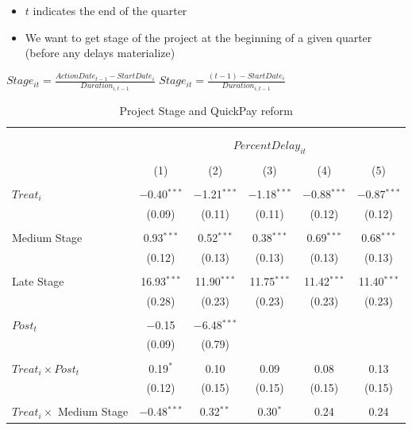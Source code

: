 \documentclass[
]{article}
\providecommand{\tightlist}{%
  \setlength{\itemsep}{0pt}\setlength{\parskip}{0pt}}
\begin{document}
\begin{itemize}
\tightlist
\item
  \(t\) indicates the end of the quarter
\item
  We want to get stage of the project at the beginning of a given
  quarter (before any delays materialize)
\end{itemize}

\(Stage_{it}=\frac{ActionDate_{t-1}-StartDate_i}{Duration_{i,t-1}}\)
\(Stage_{it}=\frac{(t-1)-StartDate_i}{Duration_{i,t-1}}\)

\begin{table}[H] \centering 
  \caption{Project Stage and QuickPay reform} 
  \label{} 
\small 
\begin{tabular}{@{\extracolsep{-2pt}}lccccc} 
\\[-1.8ex]\hline 
\hline \\[-1.8ex] 
\\[-1.8ex] & \multicolumn{5}{c}{$PercentDelay_{it}$  } \\ 
\\[-1.8ex] & (1) & (2) & (3) & (4) & (5)\\ 
\hline \\[-1.8ex] 
 $Treat_i$ & $-$0.40$^{***}$ & $-$1.21$^{***}$ & $-$1.18$^{***}$ & $-$0.88$^{***}$ & $-$0.87$^{***}$ \\ 
  & (0.09) & (0.11) & (0.11) & (0.12) & (0.12) \\ 
  & & & & & \\ 
 Medium Stage & 0.93$^{***}$ & 0.52$^{***}$ & 0.38$^{***}$ & 0.69$^{***}$ & 0.68$^{***}$ \\ 
  & (0.12) & (0.13) & (0.13) & (0.13) & (0.13) \\ 
  & & & & & \\ 
 Late Stage & 16.93$^{***}$ & 11.90$^{***}$ & 11.75$^{***}$ & 11.42$^{***}$ & 11.40$^{***}$ \\ 
  & (0.28) & (0.23) & (0.23) & (0.23) & (0.23) \\ 
  & & & & & \\ 
 $Post_t$ & $-$0.15 & $-$6.48$^{***}$ &  &  &  \\ 
  & (0.09) & (0.79) &  &  &  \\ 
  & & & & & \\ 
 $Treat_i \times Post_t$ & 0.19$^{*}$ & 0.10 & 0.09 & 0.08 & 0.13 \\ 
  & (0.12) & (0.15) & (0.15) & (0.15) & (0.15) \\ 
  & & & & & \\ 
 $Treat_i \times$ Medium Stage & $-$0.48$^{***}$ & 0.32$^{**}$ & 0.30$^{*}$ & 0.24 & 0.24 \\ 

\end{tabular}
\end{table}
\end{document}
